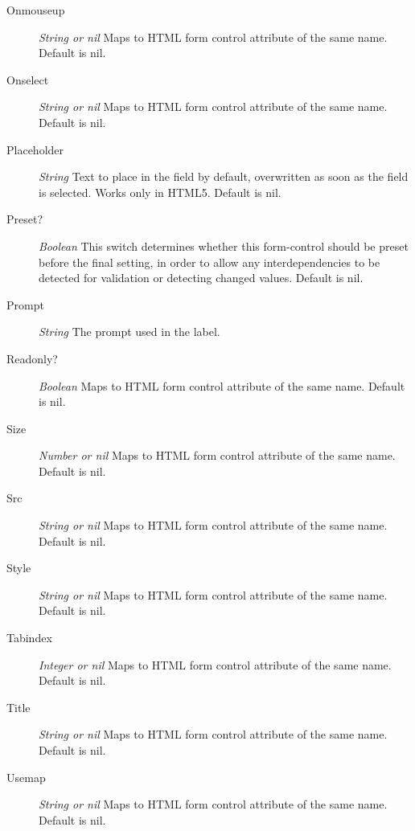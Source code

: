 \documentclass [11pt]{book}
\begin{document}
\begin{itemize}
\begin{description}
\item [Onmouseup]
\emph{String or nil} Maps to HTML form control attribute of the same name. Default is nil.


\item [Onselect]
\emph{String or nil} Maps to HTML form control attribute of the same name. Default is nil.


\item [Placeholder]
\emph{String} Text to place in the field by default, overwritten as soon as the field is selected. Works only in HTML5. Default is nil.


\item [Preset?]
\emph{Boolean} This switch determines whether this form-control should be preset before the final setting,
in order to allow any interdependencies to be detected for validation or detecting changed values. Default is nil.


\item [Prompt]
\emph{String} The prompt used in the label.


\item [Readonly?]
\emph{Boolean} Maps to HTML form control attribute of the same name. Default is nil.


\item [Size]
\emph{Number or nil} Maps to HTML form control attribute of the same name. Default is nil.


\item [Src]
\emph{String or nil} Maps to HTML form control attribute of the same name. Default is nil.


\item [Style]
\emph{String or nil} Maps to HTML form control attribute of the same name. Default is nil.


\item [Tabindex]
\emph{Integer or nil} Maps to HTML form control attribute of the same name. Default is nil.


\item [Title]
\emph{String or nil} Maps to HTML form control attribute of the same name. Default is nil.


\item [Usemap]
\emph{String or nil} Maps to HTML form control attribute of the same name. Default is nil.



\end{description}
\end{itemize}
\end{document}
